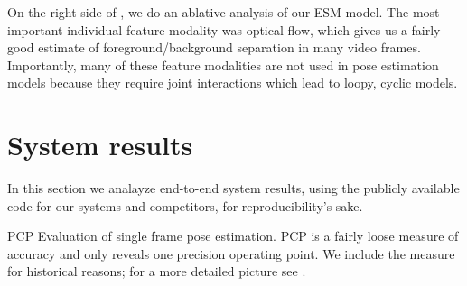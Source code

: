 On the right side of , we do an ablative analysis of our ESM 
model.  The most important individual feature modality was optical flow, which 
gives us a fairly good estimate of foreground/background separation in many 
video frames.  Importantly, many of these feature modalities are not used in 
pose estimation models because they require joint interactions which lead to 
loopy, cyclic models.


\section{System results}\label{sec:system-results}
In this section we analayze end-to-end system results, using the publicly 
available code for our systems and competitors, for reproducibility's sake.
\begin{table}[tb]
\begin{center}

\caption[PCP evaluation.]{PCP Evaluation of single frame pose estimation. PCP 
is a fairly loose measure of accuracy and only reveals one precision operating 
point.  We include the measure for historical reasons; for a more detailed 
picture see .}
\label{tab:res-table} 
\end{center}
\end{table}


